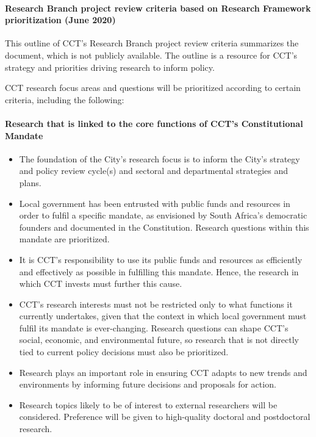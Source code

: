 \documentclass[
]{WileySix}
\providecommand{\tightlist}{%
  \setlength{\itemsep}{0pt}\setlength{\parskip}{0pt}}
\begin{document}
\hypertarget{research-branch-project-review-criteria-based-on-research-framework-prioritization-june-2020}{%
\paragraph{Research Branch project review criteria based on Research Framework prioritization (June 2020)}\label{research-branch-project-review-criteria-based-on-research-framework-prioritization-june-2020}}

This outline of CCT's Research Branch project review criteria summarizes the document, which is not publicly available. The outline is a resource for CCT's strategy and priorities driving research to inform policy.

CCT research focus areas and questions will be prioritized according to certain criteria, including the following:

\hypertarget{research-that-is-linked-to-the-core-functions-of-ccts-constitutional-mandate}{%
\paragraph{Research that is linked to the core functions of CCT's Constitutional Mandate}\label{research-that-is-linked-to-the-core-functions-of-ccts-constitutional-mandate}}

\begin{itemize}
\tightlist
\item
  The foundation of the City's research focus is to inform the City's strategy and policy review cycle(s) and sectoral and departmental strategies and plans.
\item
  Local government has been entrusted with public funds and resources in order to fulfil a specific mandate, as envisioned by South Africa's democratic founders and documented in the Constitution. Research questions within this mandate are prioritized.
\item
  It is CCT's responsibility to use its public funds and resources as efficiently and effectively as possible in fulfilling this mandate. Hence, the research in which CCT invests must further this cause.
\item
  CCT's research interests must not be restricted only to what functions it currently undertakes, given that the context in which local government must fulfil its mandate is ever-changing. Research questions can shape CCT's social, economic, and environmental future, so research that is not directly tied to current policy decisions must also be prioritized.
\item
  Research plays an important role in ensuring CCT adapts to new trends and environments by informing future decisions and proposals for action.
\item
  Research topics likely to be of interest to external researchers will be considered. Preference will be given to high-quality doctoral and postdoctoral research.
\end{itemize}
\end{document}
